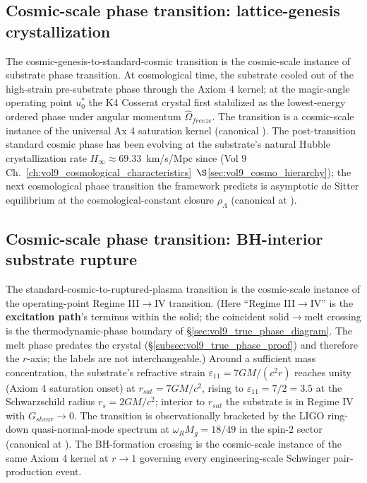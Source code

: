 \subsection{Cosmic-scale phase transition: lattice-genesis crystallization}
\label{subsec:vol9_phase_transition_genesis}

The cosmic-genesis-to-standard-cosmic transition is the cosmic-scale instance of substrate phase transition. At cosmological time, the substrate cooled out of the high-strain pre-substrate phase through the Axiom 4 kernel; at the magic-angle operating point $u_0^*$ the K4 Cosserat crystal first stabilized as the lowest-energy ordered phase under angular momentum $\hat{\Omega}_{freeze}$. The transition is a cosmic-scale instance of the universal Ax 4 saturation kernel (canonical ). The post-transition standard cosmic phase has been evolving at the substrate's natural Hubble crystallization rate $H_\infty \approx 69.33$~km/s/Mpc since (Vol 9 Ch.~\ref{ch:vol9_cosmological_characteristics}~$\S$\ref{sec:vol9_cosmo_hierarchy}); the next cosmological phase transition the framework predicts is asymptotic de Sitter equilibrium at the cosmological-constant closure $\rho_\Lambda$ (canonical at ).

\subsection{Cosmic-scale phase transition: BH-interior substrate rupture}
\label{subsec:vol9_phase_transition_bh}

The standard-cosmic-to-ruptured-plasma transition is the cosmic-scale instance of the operating-point Regime III$\to$IV transition. (Here ``Regime III$\to$IV'' is the \textbf{excitation path}'s terminus within the solid; the coincident solid$\to$melt crossing is the thermodynamic-phase boundary of \S\ref{sec:vol9_true_phase_diagram}. The melt phase predates the crystal (\S\ref{subsec:vol9_true_phase_proof}) and therefore the $r$-axis; the labels are not interchangeable.) Around a sufficient mass concentration, the substrate's refractive strain $\varepsilon_{11} = 7GM/(c^2 r)$ reaches unity (Axiom 4 saturation onset) at $r_{sat} = 7GM/c^2$, rising to $\varepsilon_{11} = 7/2 = 3.5$ at the Schwarzschild radius $r_s = 2GM/c^2$; interior to $r_{sat}$ the substrate is in Regime IV with $G_{shear} \to 0$. The transition is observationally bracketed by the LIGO ring-down quasi-normal-mode spectrum at $\omega_R M_g = 18/49$ in the spin-2 sector (canonical at ). The BH-formation crossing is the cosmic-scale instance of the same Axiom 4 kernel at $r \to 1$ governing every engineering-scale Schwinger pair-production event.

